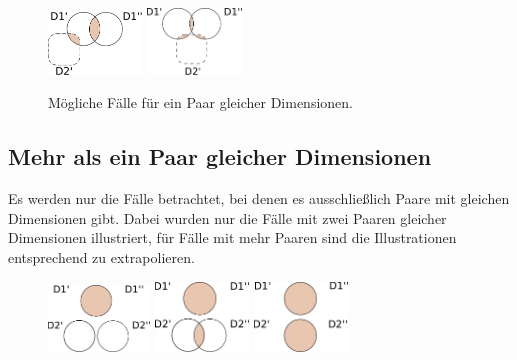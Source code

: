 \documentclass[11pt]{article}
\begin{document}
\begin{figure}[!htb]
%
    \centering
    \includegraphics[width=2.5cm]{CaseDifferentiation/CaseDifferentiation_1SameDim_SomeDePairPartnered_ConnUnequalDimDiffDS.pdf}
    \label{}
\endminipage
{}%
    \centering    
    \includegraphics[width=2.5cm]{CaseDifferentiation/CaseDifferentiation_1SameDim_SomeDePairPartnered_UnequalDimConnectBoth.pdf}
    \label{}
\endminipage
    \caption{Mögliche Fälle für ein Paar gleicher Dimensionen.}
\end{figure}


%
%
\clearpage
\subsection{Mehr als ein Paar gleicher Dimensionen} 

Es werden nur die Fälle betrachtet, bei denen es ausschließlich Paare mit gleichen Dimensionen gibt. Dabei wurden nur die Fälle mit zwei Paaren gleicher Dimensionen illustriert, für Fälle mit mehr Paaren sind die  Illustrationen entsprechend zu extrapolieren. \\

\begin{figure}[!htb]
%
    \centering
  \includegraphics[width=2.7cm]{CaseDifferentiation/CaseDifferentiation_2SameDim_1DimAllDePairPartnered_1DimNoDePairPartnered.pdf}
  \label{}
\endminipage
{}
    \centering
    \includegraphics[width=2.5cm]{CaseDifferentiation/CaseDifferentiation_2SameDim_1DimAllDePairPartnered_1DimSomeDePairPartnered.pdf}
  \label{}
\endminipage\hfill
{}%
    \centering
  \includegraphics[width=2.5cm]{CaseDifferentiation/CaseDifferentiation_2SameDim_AllDePairPartnered.pdf}
  \label{}
\endminipage
\end{figure}
\end{document}
